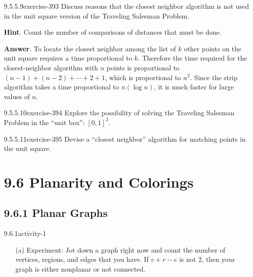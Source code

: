 \documentclass[twoside,10pt,]{book}
\numberwithin{equation}{section}
\begin{document}
\begin{divisionsolution}{9.5.5.9}{}{exercise-393}%
\hypertarget{p-3416}{}%
Discuss reasons that the closest neighbor algorithm is not used in the unit square version of the Traveling Salesman Problem.%
\par\smallskip%
\noindent\textbf{Hint}.\quad%
\hypertarget{p-3417}{}%
Count the number of comparisons of distances that must be done.%
\par\smallskip%
\noindent\textbf{Answer}.\quad%
\hypertarget{p-3418}{}%
To locate the closest neighbor among the list of \(k\) other points on the unit square requires a time proportional to \(k\). Therefore the time required for the closest-neighbor algorithm with \(n\) points is proportional to \((n-1)+(n-2)+\cdots +2+1\), which is proportional to \(n^2\). Since the strip algorithm takes a time proportional to \(n(\log  n)\), it is much faster for large values of \(n\).%
\end{divisionsolution}%
\begin{divisionsolution}{9.5.5.10}{}{exercise-394}%
\hypertarget{p-3419}{}%
Explore the possibility of solving the Traveling Salesman Problem in the ``unit box'': \([0,1]^3\).%
\end{divisionsolution}%
\begin{divisionsolution}{9.5.5.11}{}{exercise-395}%
\hypertarget{p-3420}{}%
Devise a ``closest neighbor'' algorithm for matching points in the unit square.%
\end{divisionsolution}%
\section*{9.6 Planarity and Colorings}
\subsection*{9.6.1 Planar Graphs}
\begin{activitysolution}{9.6.1}{}{activity-1}%
\leavevmode%
\begin{enumerate}[font=\bfseries,label=(\alph*),ref=\alph*]
\item[(a)] \hypertarget{p-3434}{}%
Experiment: Jot down a graph right now and count the number of vertices, regions, and edges that you have. If \(v + r - e\) is not 2, then your graph is either nonplanar or not connected.%
\end{enumerate}
\end{activitysolution}%
\end{document}

